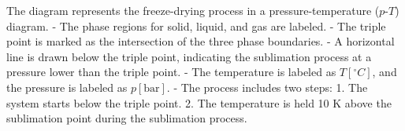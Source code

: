 The diagram represents the freeze-drying process in a pressure-temperature (\(p\)-\(T\)) diagram.  
- The phase regions for solid, liquid, and gas are labeled.  
- The triple point is marked as the intersection of the three phase boundaries.  
- A horizontal line is drawn below the triple point, indicating the sublimation process at a pressure lower than the triple point.  
- The temperature is labeled as \(T [^\circ C]\), and the pressure is labeled as \(p [\text{bar}]\).  
- The process includes two steps:  
  1. The system starts below the triple point.  
  2. The temperature is held 10 K above the sublimation point during the sublimation process.